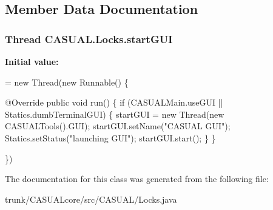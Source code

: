 \subsection{Member Data Documentation}
\hypertarget{classCASUAL_1_1Locks_aab99d065f2c885eeb6ec25a5253c67fd}{
\subsubsection[{start\-G\-U\-I}]{\setlength{\rightskip}{0pt plus 5cm}Thread C\-A\-S\-U\-A\-L.\-Locks.\-start\-G\-U\-I\hspace{0.3cm}{\ttfamily [static]}}}\label{classCASUAL_1_1Locks_aab99d065f2c885eeb6ec25a5253c67fd}
{\bfseries Initial value\-:}
\begin{DoxyCode}
= \textcolor{keyword}{new} Thread(\textcolor{keyword}{new} Runnable() \{

        @Override
        \textcolor{keyword}{public} \textcolor{keywordtype}{void} run() \{
            \textcolor{keywordflow}{if} (CASUALMain.useGUI || Statics.dumbTerminalGUI) \{
                startGUI = \textcolor{keyword}{new} Thread(\textcolor{keyword}{new} CASUALTools().GUI);
                startGUI.setName(\textcolor{stringliteral}{"CASUAL GUI"});
                Statics.setStatus(\textcolor{stringliteral}{"launching GUI"});
                startGUI.start();
            \}
        \}

    \})
\end{DoxyCode}


The documentation for this class was generated from the following file\-:\begin{DoxyCompactItemize}
\item 
trunk/\-C\-A\-S\-U\-A\-Lcore/src/\-C\-A\-S\-U\-A\-L/Locks.\-java\end{DoxyCompactItemize}
